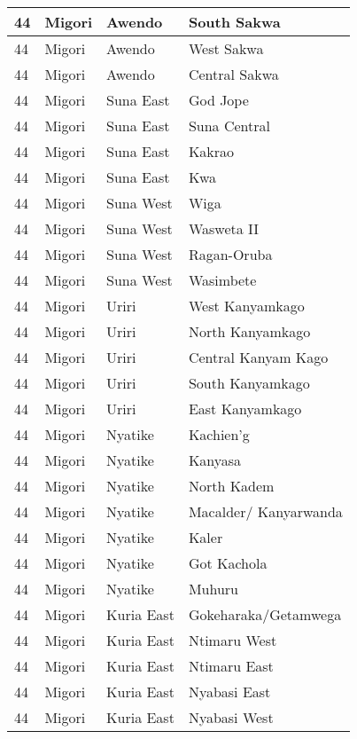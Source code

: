 \begin{table}[!ht]
\begin{tabular}{|l|l|l|l|}
        44 & Migori & Awendo & South Sakwa \\ \hline
        44 & Migori & Awendo & West Sakwa \\ \hline
        44 & Migori & Awendo & Central Sakwa \\ \hline
        44 & Migori & Suna East & God Jope \\ \hline
        44 & Migori & Suna East & Suna Central \\ \hline
        44 & Migori & Suna East & Kakrao \\ \hline
        44 & Migori & Suna East & Kwa \\ \hline
        44 & Migori & Suna West & Wiga \\ \hline
        44 & Migori & Suna West & Wasweta II \\ \hline
        44 & Migori & Suna West & Ragan-Oruba \\ \hline
        44 & Migori & Suna West & Wasimbete \\ \hline
        44 & Migori & Uriri & West Kanyamkago \\ \hline
        44 & Migori & Uriri & North Kanyamkago \\ \hline
        44 & Migori & Uriri & Central Kanyam Kago \\ \hline
        44 & Migori & Uriri & South Kanyamkago \\ \hline
        44 & Migori & Uriri & East Kanyamkago \\ \hline
        44 & Migori & Nyatike & Kachien’g \\ \hline
        44 & Migori & Nyatike & Kanyasa \\ \hline
        44 & Migori & Nyatike & North Kadem \\ \hline
        44 & Migori & Nyatike & Macalder/ Kanyarwanda \\ \hline
        44 & Migori & Nyatike & Kaler \\ \hline
        44 & Migori & Nyatike & Got Kachola \\ \hline
        44 & Migori & Nyatike & Muhuru \\ \hline
        44 & Migori & Kuria East & Gokeharaka/Getamwega \\ \hline
        44 & Migori & Kuria East & Ntimaru West \\ \hline
        44 & Migori & Kuria East & Ntimaru East \\ \hline
        44 & Migori & Kuria East & Nyabasi East \\ \hline
        44 & Migori & Kuria East & Nyabasi West \\ \hline

\end{tabular}
\end{table}
